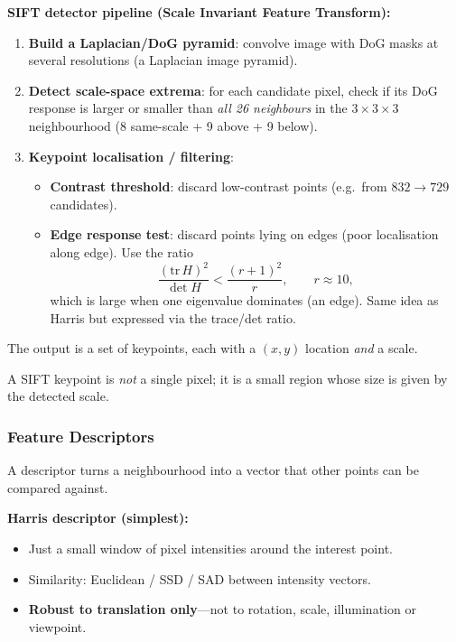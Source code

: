 \textbf{SIFT detector pipeline (Scale Invariant Feature Transform):}
\begin{enumerate}
  \item \textbf{Build a Laplacian/DoG pyramid}: convolve image with DoG masks at several resolutions (a Laplacian image pyramid).
  \item \textbf{Detect scale-space extrema}: for each candidate pixel, check if its DoG response is larger or smaller than \emph{all 26 neighbours} in the $3 \times 3 \times 3$ neighbourhood (8 same-scale + 9 above + 9 below).
  \item \textbf{Keypoint localisation / filtering}:
  \begin{itemize}
    \item \textbf{Contrast threshold}: discard low-contrast points (e.g.\ from $832 \to 729$ candidates).
    \item \textbf{Edge response test}: discard points lying on edges (poor localisation along edge). Use the ratio
    \[
    \frac{(\mathrm{tr}\, H)^2}{\det H} < \frac{(r+1)^2}{r}, \qquad r \approx 10,
    \]
    which is large when one eigenvalue dominates (an edge). Same idea as Harris but expressed via the trace/det ratio.
  \end{itemize}
\end{enumerate}

The output is a set of keypoints, each with a $(x,y)$ location \emph{and} a scale.

\begin{tipbox}
A SIFT keypoint is \emph{not} a single pixel; it is a small region whose size is given by the detected scale.
\end{tipbox}

\bigseparator

\subsubsection{Feature Descriptors}

A descriptor turns a neighbourhood into a vector that other points can be compared against.

\textbf{Harris descriptor (simplest):}
\begin{itemize}
  \item Just a small window of pixel intensities around the interest point.
  \item Similarity: Euclidean / SSD / SAD between intensity vectors.
  \item \textbf{Robust to translation only}---not to rotation, scale, illumination or viewpoint.
\end{itemize}

